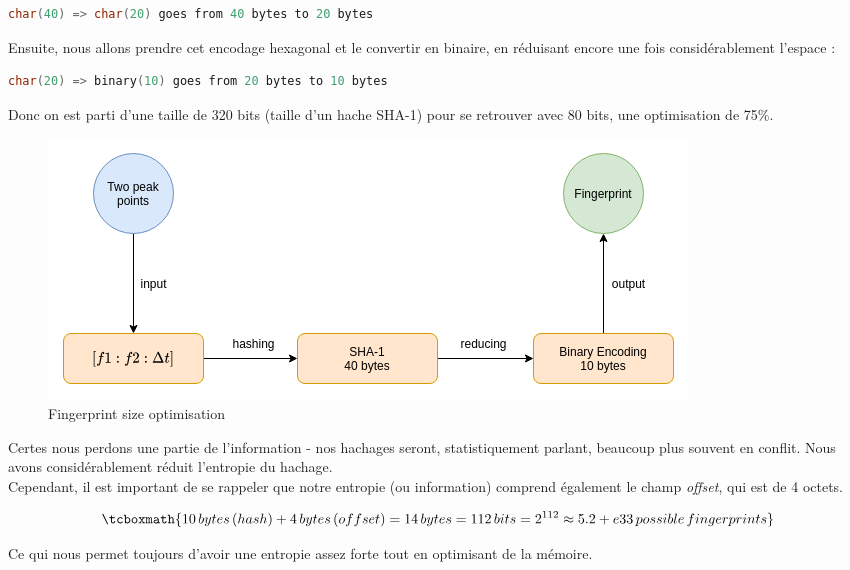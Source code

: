 \documentclass[11pt, report, french]{scrreprt}
\begin{document}
\begin{lstlisting}[language=C]
char(40) => char(20) goes from 40 bytes to 20 bytes
\end{lstlisting}

Ensuite, nous allons prendre cet encodage hexagonal et le convertir en binaire, en réduisant encore une fois considérablement l'espace :\\

\begin{lstlisting}[language=C]
char(20) => binary(10) goes from 20 bytes to 10 bytes
\end{lstlisting}

\vspace{0.5cm}
Donc on est parti d'une taille de 320 bits (taille d'un hache SHA-1) pour se retrouver avec 80 bits, une optimisation de 75\%.\\


\begin{figure}[H]
	\centering
	\includegraphics[scale=0.55]{img/hash_reduction.png}
	\caption{Fingerprint size optimisation}
\end{figure}

Certes nous perdons une partie de l'information - nos hachages seront, statistiquement parlant, beaucoup plus souvent en conflit. Nous avons considérablement réduit l'entropie du hachage. \\
Cependant, il est important de se rappeler que notre entropie (ou information) comprend également le champ \textit{offset}, qui est de 4 octets.

\begin{equation}
\tcboxmath{ 10 \, bytes \, (hash) + 4 \, bytes \, (offset) = 14 \, bytes = 112 \, bits = 2^{112} \approx 5.2+e33 \, possible \, fingerprints  }
\end{equation}

\vspace{0.5cm}
Ce qui nous permet toujours d'avoir une entropie assez forte tout en optimisant de la mémoire.
\end{document}
